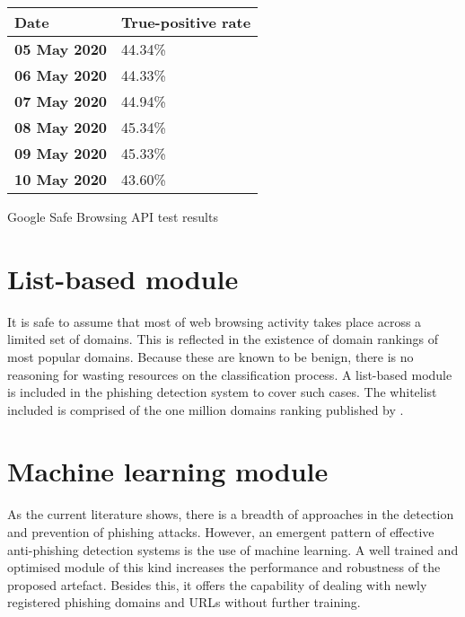 \begin{singlespace}
	\begin{center}
		\begin{tabular}{ m{10em} m{10em} } \toprule
			\textbf{Date}        & \textbf{True-positive rate} \\ \midrule

			\textbf{05 May 2020} & 44.34\%                     \\

			\textbf{06 May 2020} & 44.33\%                     \\

			\textbf{07 May 2020} & 44.94\%                     \\

			\textbf{08 May 2020} & 45.34\%                     \\

			\textbf{09 May 2020} & 45.33\%                     \\

			\textbf{10 May 2020} & 43.60\%                     \\ \bottomrule
		\end{tabular}
		\captionsetup{type=table}\caption{Google Safe Browsing API test results}
		\label{tab:GSBAPI_RESULTS}
	\end{center}
\end{singlespace}


\section{List-based module}
It is safe to assume that most of web browsing activity takes place across a limited set of domains. This is reflected in the existence of domain rankings of most popular domains. Because these are known to be benign, there is no reasoning for wasting resources on the classification process. A list-based module is included in the phishing detection system to cover such cases. The whitelist included is comprised of the one million domains ranking published by \cite{Majestic}.

\section{Machine learning module}
As the current literature shows, there is a breadth of approaches in the detection and prevention of phishing attacks. However, an emergent pattern of effective anti-phishing detection systems is the use of machine learning. A well trained and optimised module of this kind increases the performance and robustness of the proposed artefact. Besides this, it offers the capability of dealing with newly registered phishing domains and URLs without further training.

